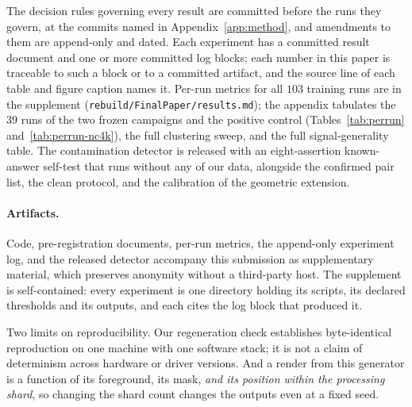 \documentclass{article}
\begin{document}
The decision rules governing every result are committed before the runs they govern, at the commits
named in Appendix~\ref{app:method}, and amendments to them are append-only and dated. Each experiment
has a committed result document and one or more committed log blocks; each number in this paper is
traceable to such a block or to a committed artifact, and the source line of each table and figure
caption names it. Per-run metrics for all $103$ training runs are in the supplement
(\texttt{rebuild/FinalPaper/results.md}); the appendix tabulates the $39$ runs of the two frozen
campaigns and the positive control (Tables~\ref{tab:perrun} and~\ref{tab:perrun-nc4k}), the full
clustering sweep, and the full signal-generality table. The contamination detector is released with an
eight-assertion known-answer self-test that runs without any of our data, alongside the confirmed
pair list, the clean protocol, and the calibration of the geometric extension.

\paragraph{Artifacts.} Code, pre-registration documents, per-run metrics, the append-only experiment
log, and the released detector accompany this submission as supplementary material, which preserves
anonymity without a third-party host.
The supplement is self-contained: every experiment is one directory holding its
scripts, its declared thresholds and its outputs, and each cites the log block that produced it.

Two limits on reproducibility. Our regeneration check
establishes byte-identical reproduction on one machine with one software stack; it is not a claim of
determinism across hardware or driver versions. And a render from this generator is a function of its
foreground, its mask, \emph{and its position within the processing shard}, so changing the shard count
changes the outputs even at a fixed seed.




\appendix

\end{document}
